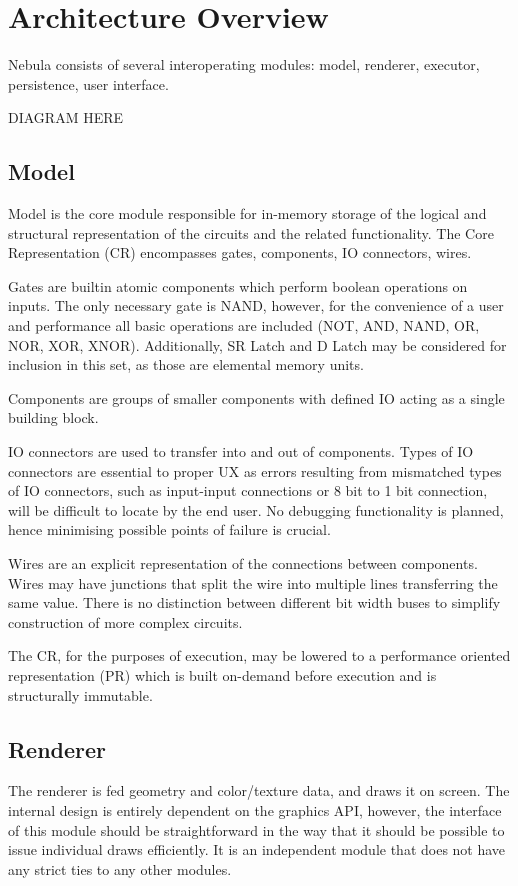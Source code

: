 \documentclass[12pt, a4paper]{article}
\begin{document}
\section{Architecture Overview}
Nebula consists of several interoperating modules: model, renderer, executor,
persistence, user interface.

DIAGRAM HERE

\subsection{Model}
Model is the core module responsible for in-memory storage of the logical and
structural representation of the circuits and the related functionality. The
Core Representation (CR) encompasses gates, components, IO connectors, wires.

Gates are builtin atomic components which perform boolean operations on inputs.
The only necessary gate is NAND, however, for the convenience of a user and
performance all basic operations are included (NOT, AND, NAND, OR, NOR, XOR,
XNOR). Additionally, SR Latch and D Latch may be considered for inclusion in
this set, as those are elemental memory units.

Components are groups of smaller components with defined IO acting as a single
building block.

IO connectors are used to transfer into and out of components. Types of IO
connectors are essential to proper UX as errors resulting from mismatched types
of IO connectors, such as input-input connections or 8 bit to 1 bit connection,
will be difficult to locate by the end user. No debugging functionality is
planned, hence minimising possible points of failure is crucial.

Wires are an explicit representation of the connections between components.
Wires may have junctions that split the wire into multiple lines transferring
the same value. There is no distinction between different bit width buses to
simplify construction of more complex circuits.

The CR, for the purposes of execution, may be lowered to a performance oriented
representation (PR) which is built on-demand before execution and is
structurally immutable.

\subsection{Renderer}
The renderer is fed geometry and color/texture data, and draws it on screen. The
internal design is entirely dependent on the graphics API, however, the
interface of this module should be straightforward in the way that it should be
possible to issue individual draws efficiently. It is an independent module that
does not have any strict ties to any other modules.
\end{document}
